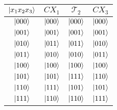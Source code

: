 \vspace{-10pt}
\begin{center}
\begin{tabular}{c|c|c|c|} 
$\ket{x_1x_2x_3}$ & $CX_1$ & $\mathcal{T}_2$ & $CX_3$ \\
\hline
$\ket{000}$ & $\ket{000}$ & $\ket{000}$ & $\ket{000}$  \\
\hline
$\ket{001}$  & $\ket{001}$ & $\ket{001}$ & $\ket{001}$ \\
\hline
$\ket{010}$ & $\ket{011}$ & $\ket{011}$ & $\ket{010}$ \\
\hline
$\ket{011}$& $\ket{010}$ & $\ket{010}$ & $\ket{011}$ \\
\hline
$\ket{100}$ & $\ket{100}$ & $\ket{100}$ & $\ket{100}$ \\
\hline
$\ket{101}$ & $\ket{101}$ & $\ket{111}$ & $\ket{110}$ \\
\hline
$\ket{110}$ & $\ket{111}$ & $\ket{101}$ & $\ket{101}$ \\
\hline
$\ket{111}$ & $\ket{110}$ & $\ket{110}$ & $\ket{111}$ 
\end{tabular}
\end{center}
\vspace{-5pt}

